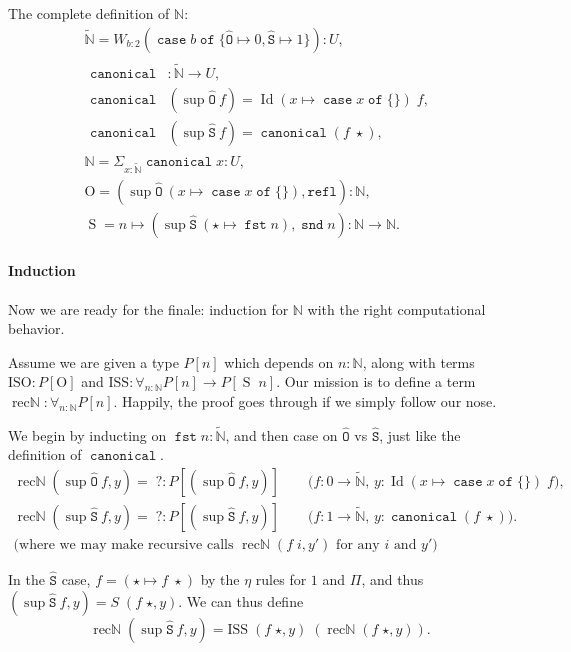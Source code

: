 \documentclass[a4paper,UKenglish,cleveref,nameinlink,autoref,thm-restate]{lipics-v2019}
\newcommand{\zero}{0}
\newcommand{\one}{1}
\newcommand{\bool}{2}
\newcommand{\codeO}{\mathtt{\hat{O}}}
\newcommand{\codeS}{\mathtt{\hat{S}}}
\DeclareMathOperator{\supop}{sup}
\renewcommand{\sup}[2]{\supop {#1}\:\!{#2}}
\newcommand{\N}{\hyperref[define-N]{\mathbb{N}}}
\newcommand{\preN}{\hyperref[define-preN]{\tilde{\mathbb{N}}}}
\DeclareMathOperator{\case}{\mathtt{case}}
\newcommand{\caset}[2]{\case {#1}\;\mathtt{of}\;\{{#2}\}}
\DeclareMathOperator{\Idop}{\mathrm{Id}}
\newcommand{\Id}[2]{\Idop {#1}\;{#2}}
\newcommand{\refl}{\mathtt{refl}}
\DeclareMathOperator{\fst}{\mathtt{fst}}
\DeclareMathOperator{\snd}{\mathtt{snd}}
\DeclareMathOperator{\canonical}{\hyperref[define-canonical]{\mathtt{canonical}}}
\newcommand{\ISO}{\mathrm{ISO}}
\newcommand{\ISS}{\mathrm{ISS}}
\newcommand{\zerO}{\hyperref[define-O]{\mathrm{O}}}
\DeclareMathOperator{\Succ}{\hyperref[define-S]{S}}
\DeclareMathOperator{\recN}{\mathrm{rec\mathbb{N}}}
\begin{document}
\begin{definition}The complete definition of $\N$:
\begin{gather}
\preN = W_{b : \bool} (\caset{b}{\codeO \mapsto \zero, \codeS \mapsto \one}) : U,\nonumber\\
\begin{aligned}
\canonical& : \preN \to U,\\
\canonical& (\sup{\codeO}{f}) = \Id{(x\mapsto\caset{x}{})}{f},\\
\canonical& (\sup{\codeS}{f}) = \canonical(f\;\star),
\end{aligned}\label{define-canonical}\\
\N = \Sigma_{x : \preN}\canonical x : U,\label{define-N}\\
\zerO = (\sup{\codeO}{(x\mapsto\caset{x}{})},\refl) : \N,\label{define-O}\\
\Succ = n \mapsto (\sup{\codeS}{(\star \mapsto \fst n)},\snd n) : \N \to \N.\label{define-S}
\end{gather}
\end{definition}

\paragraph*{Induction}

Now we are ready for the finale: induction for $\N$ with the right computational behavior.

Assume we are given a type $P[n]$ which depends on $n : \N$, along with terms $\ISO : P[\zerO]$ and $\ISS : \forall_{n : \N}P[n] \to P[\Succ\;n]$. Our mission is to define a term $\recN : \forall_{n : \N}P[n]$. Happily, the proof goes through if we simply follow our nose.

We begin by inducting on $\fst n : \preN$, and then case on $\codeO$ vs $\codeS$, just like the definition of $\canonical$.
\begin{gather*}
\recN (\sup{\codeO}{f},y) =\; ? : P[(\sup{\codeO}{f},y)]\qquad\text{($f : \zero \to \preN$, $y : \Id{(x\mapsto\caset{x}{})}{f}$)},\\
\recN (\sup{\codeS}{f},y) =\; ? : P[(\sup{\codeS}{f},y)]\qquad\text{($f : \one \to \preN$, $y : \canonical(f\;\star)$)}.\\
\text{(where we may make recursive calls $\recN(f\; i, y')$ for any $i$ and $y'$)}
\end{gather*}

In the $\codeS$ case, $f = (\star \mapsto f\; \star)$ by the $\eta$ rules for $\one$ and $\Pi$, and thus $(\sup{\codeS}{f}, y) = S\;(f\; \star, y)$. We can thus define
\begin{equation*}\recN (\sup{\codeS}{f},y) = \ISS\;(f\;\star, y)\;(\recN(f\;\star, y)).\end{equation*}
\end{document}
